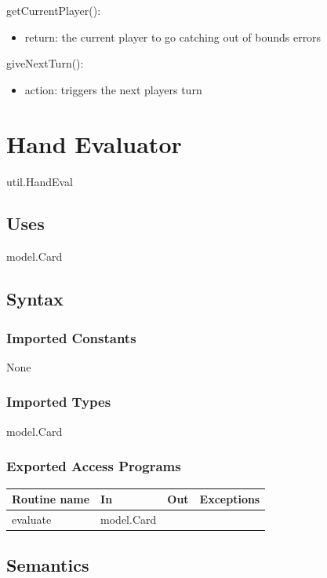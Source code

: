 \documentclass[12pt, titlepage]{article}
\begin{document}
\noindent getCurrentPlayer():
\begin{itemize}
    \item return: the current player to go
    \exception catching out of bounds errors
\end{itemize}

\noindent giveNextTurn():
\begin{itemize}
    \item action: triggers the next players turn
\end{itemize}



\section*{Hand Evaluator}

util.HandEval

\subsection* {Uses}

model.Card

\subsection* {Syntax}

\subsubsection* {Imported Constants}

None

\subsubsection* {Imported Types}

model.Card

\subsubsection* {Exported Access Programs}

\begin{tabular}{| l | l | l | p{5cm} |}
\hline
\textbf{Routine name} & \textbf{In} & \textbf{Out} & \textbf{Exceptions}\\
\hline
evaluate & model.Card & &\\
\hline
\end{tabular}

\subsection* {Semantics}
\end{document}
